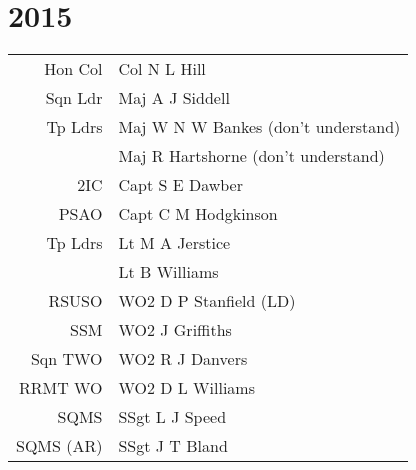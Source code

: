 \chapter*{2015}

\begin{center}
  \begin{tabular}{rl}
    Hon Col & Col N L Hill \\
    Sqn Ldr & Maj A J Siddell \\
    Tp Ldrs & Maj W N W Bankes (don't understand) \\
     & Maj R Hartshorne (don't understand) \\
    2IC & Capt S E Dawber \\
    PSAO & Capt C M Hodgkinson \\
    Tp Ldrs & Lt M A Jerstice \\
     & Lt B Williams \\
    RSUSO & WO2 D P Stanfield (LD) \\
    SSM & WO2 J Griffiths \\
    Sqn TWO & WO2 R J Danvers \\
    RRMT WO & WO2 D L Williams \\
    SQMS & SSgt L J Speed \\
    SQMS (AR) & SSgt J T Bland \\
  \end{tabular}
\end{center}

